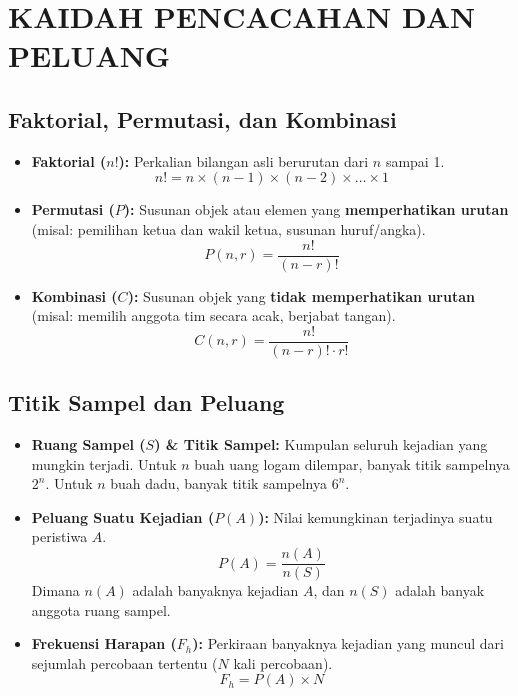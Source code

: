 \documentclass[12pt, a4paper]{article}
\begin{document}
\section{KAIDAH PENCACAHAN DAN PELUANG}

\subsection{Faktorial, Permutasi, dan Kombinasi}
\begin{itemize}
    \item \textbf{Faktorial ($n!$):} Perkalian bilangan asli berurutan dari $n$ sampai 1.
          \[ n! = n \times (n-1) \times (n-2) \times \dots \times 1 \] 
    \item \textbf{Permutasi ($P$):} Susunan objek atau elemen yang \textbf{memperhatikan urutan} (misal: pemilihan ketua dan wakil ketua, susunan huruf/angka).
          \[ P(n, r) = \frac{n!}{(n-r)!} \] 
    \item \textbf{Kombinasi ($C$):} Susunan objek yang \textbf{tidak memperhatikan urutan} (misal: memilih anggota tim secara acak, berjabat tangan).
          \[ C(n, r) = \frac{n!}{(n-r)! \cdot r!} \] 
\end{itemize}

\subsection{Titik Sampel dan Peluang}
\begin{itemize}
    \item \textbf{Ruang Sampel ($S$) \& Titik Sampel:} Kumpulan seluruh kejadian yang mungkin terjadi. Untuk $n$ buah uang logam dilempar, banyak titik sampelnya $2^n$. Untuk $n$ buah dadu, banyak titik sampelnya $6^n$.
    \item \textbf{Peluang Suatu Kejadian ($P(A)$):} Nilai kemungkinan terjadinya suatu peristiwa $A$.
          \[ P(A) = \frac{n(A)}{n(S)} \] 
          Dimana $n(A)$ adalah banyaknya kejadian $A$, dan $n(S)$ adalah banyak anggota ruang sampel.
    \item \textbf{Frekuensi Harapan ($F_h$):} Perkiraan banyaknya kejadian yang muncul dari sejumlah percobaan tertentu ($N$ kali percobaan).
          \[ F_h = P(A) \times N \] 
\end{itemize}
\end{document}
